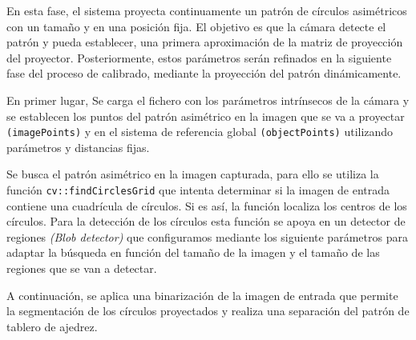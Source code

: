 En esta fase, el sistema proyecta continuamente un patrón de círculos asimétricos con un tamaño y en una posición fija. El objetivo es que la cámara detecte el patrón y pueda establecer, una primera aproximación de la matriz de proyección del proyector. Posteriormente, estos parámetros serán refinados en la siguiente fase del proceso de calibrado, mediante la proyección del patrón dinámicamente.

En primer lugar, Se carga el fichero con los parámetros intrínsecos de la cámara y se establecen los puntos del patrón asimétrico en la imagen que se va a proyectar \texttt{(imagePoints)} y en el sistema de referencia global \texttt{(objectPoints)} utilizando parámetros y distancias fijas.  


Se busca el patrón asimétrico en la imagen capturada, para ello se utiliza la función \texttt{cv::findCirclesGrid} que intenta determinar si la imagen de entrada contiene una cuadrícula de círculos. Si es así, la función localiza los centros de los círculos. Para la detección de los círculos esta función se apoya en un detector de regiones \emph{(Blob detector)} que configuramos mediante los siguiente parámetros para adaptar la búsqueda en función del tamaño de la imagen y el tamaño de las regiones que se van a detectar.


A continuación, se aplica una binarización de la imagen de entrada que permite la segmentación de los círculos proyectados y realiza una separación del patrón de tablero de ajedrez.


